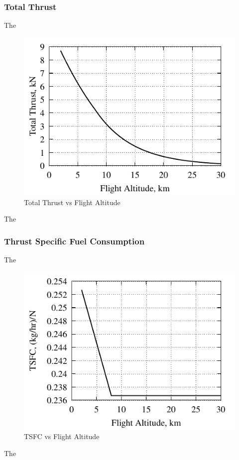 \documentclass[conf]{new-aiaa} %
\begin{document}
\subsubsection{Total Thrust}
The

\begin{figure}[hbt!]
\centering
\includegraphics[]{media/performance_parameter_files/part_d_T.pdf}
\caption{\label{fig:partdt} Total Thrust vs Flight Altitude}
\end{figure}
The

\subsubsection{Thrust Specific Fuel Consumption}
The

\begin{figure}[hbt!]
\centering
\includegraphics[]{media/performance_parameter_files/part_d_TSFC.pdf}
\caption{\label{fig:partdtsfc} TSFC vs Flight Altitude}
\end{figure}
The
\end{document}
